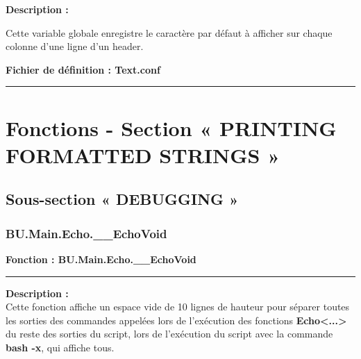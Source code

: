 \documentclass[a4paper,10pt]{article}
\begin{document}
\setlength{\parskip}{2em}

\begin{justify}
    \textbf{Description :}
\end{justify}

\setlength{\parskip}{1em}

\begin{justify}
    Cette variable globale enregistre le caractère par défaut à afficher sur chaque colonne d'une ligne d'un header.
\end{justify}

\textbf{Fichier de définition : \color{path}Text.conf}\\[1\baselineskip]





\color{sec1}\par\noindent\rule{\textwidth}{0.4pt}\color{text}

\color{sec1}
\section{Fonctions - Section « PRINTING FORMATTED STRINGS »}\color{text}

\color{sec2}
\subsection{Sous-section « DEBUGGING »}\color{text}

\color{sec3}
\subsubsection{BU.Main.Echo.\_\_EchoVoid}\color{text}

\textbf{Fonction : \color{func}BU.Main.Echo.\_\_EchoVoid}\setlength{\parskip}{1em}


\par\noindent\rule{\textwidth}{0.4pt}

\begin{justify}
    \textbf{Description :}\\[1\baselineskip]
    Cette fonction affiche un espace vide de 10 lignes de hauteur pour séparer toutes les sorties des commandes appelées lors de l'exécution des fonctions \textbf{\color{func}Echo<...>} du reste des sorties du script, lors de l'exécution du script avec la commande \textbf{\color{cmds}bash -x}, qui affiche tous.
\end{justify}
\end{document}

